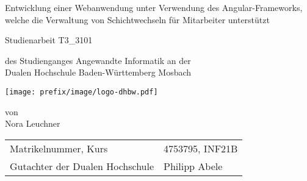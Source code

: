 \def\doctype{Dokumententyp}
\def\title{Entwicklung einer Webanwendung unter Verwendung des Angular-Frameworks,
welche die Verwaltung von Schichtwechseln für Mitarbeiter unterstützt}
\def\author{Nora Leuchner}

\begin{titlepage}

	\vspace{10mm}

	\begin{center}
		\vspace{5mm}

		\huge \title

		\vspace{14.2pt}



		\vspace{42.6pt}

		\large Studienarbeit T3\_3101

		\vspace{42.6pt}

		\small des Studienganges Angewandte Informatik an der \\
		\large Dualen Hochschule Baden-Württemberg Mosbach

		\vspace{14.2pt}

		\texttt{[image: prefix/image/logo-dhbw.pdf]}

		\vspace{42.6pt}

		\small von \\
		\large \author
	\end{center}

	\vspace{140pt}

	\begin{table}[h]
		\centering
		\begin{tabular}{ll}
			\small Matrikelnummer, Kurs            & 4753795, INF21B \\
			\small Gutachter der Dualen Hochschule & Philipp Abele   \\
		\end{tabular}
	\end{table}

	\vspace{49.7pt}


\end{titlepage}